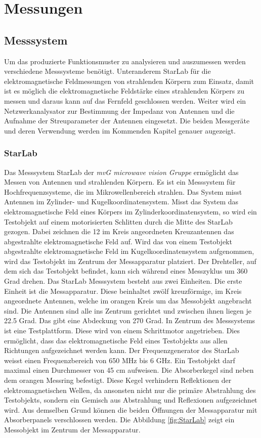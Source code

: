 \newpage
\chapter{Messungen}
\label{sec:Messung}
\section{Messsystem}
Um das produzierte Funktionsmuster zu analysieren und auszumessen werden verschiedene Messsysteme benötigt. Unteranderem StarLab für die elektromagnetische Feldmessungen von strahlenden Körpern zum Einsatz, damit ist es möglich die elektromagnetische Feldstärke eines strahlenden Körpers zu messen und daraus kann auf das Fernfeld geschlossen werden. Weiter wird ein Netzwerkanalysator zur Bestimmung der Impedanz von Antennen und die Aufnahme der Streuparameter der Antennen eingesetzt. Die beiden Messgeräte und deren Verwendung werden im Kommenden Kapitel genauer augezeigt.\\

\subsection{StarLab}
Das Messsystem  StarLab der \textit{mvG microwave vision Gruppe} ermöglicht das Messen von Antennen und strahlenden Körpern. Es ist ein Messsystem für Hochfrequenzsysteme, die im Mikrowellenbereich strahlen. Das System misst Antennen im Zylinder- und Kugelkoordinatensystem. Misst das System das elektromagnetische Feld eines Körpers im Zylinderkoordinatensystem, so wird ein Testobjekt auf einem motorisierten Schlitten durch die Mitte des StarLab gezogen. Dabei zeichnen die 12 im Kreis angeordneten Kreuzantennen das abgestrahlte elektromagnetische Feld auf. 
Wird das von einem Testobjekt abgestrahlte elektromagnetische Feld im Kugelkoordinatensystem aufgenommen, wird das Testobjekt im Zentrum der Messapparatur platziert. Der Drehteller, auf dem sich das Testobjekt befindet, kann sich während eines Messzyklus um 360 Grad drehen. 
Das StarLab Messsystem besteht aus  zwei Einheiten. Die erste Einheit ist die Messapparatur. Diese beinhaltet zwölf kreuzförmige, im Kreis angeordnete Antennen, welche im orangen Kreis um das Messobjekt angebracht sind.  Die Antennen sind alle ins Zentrum gerichtet und zwischen ihnen liegen je 22.5 Grad. Das gibt eine Abdeckung von 270 Grad. In Zentrum des Messsystems ist eine Testplattform. Diese wird von einem Schrittmotor angetrieben. Dies ermöglicht, dass das elektromagnetische Feld eines Testobjekts aus allen Richtungen aufgezeichnet werden kann. Der Frequenzgenerator des StarLab weisst einen Frequenzbereich von 650 MHz bis 6 GHz. Ein Testobjekt darf maximal einen Durchmesser von 45 cm aufweisen.
Die Absorberkegel sind neben dem orangen Messring befestigt. Diese Kegel verhindern Reflektionen der elektromagnetischen Wellen, da ansonsten nicht nur die primäre Abstrahlung des Testobjekts, sondern ein Gemisch aus Abstrahlung und Reflexionen aufgezeichnet wird. Aus demselben Grund können die beiden Öffnungen der Messapparatur mit Absorberpanels verschlossen werden. Die Abbildung \ref{fig:StarLab} zeigt ein Messobjekt im Zentrum der Messapparatur. 

